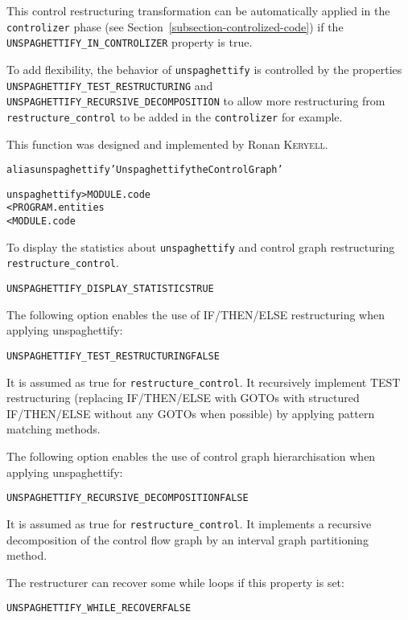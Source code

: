 \documentclass[a4paper]{report}
\newenvironment{PipsProp}{\begin{alltt}}{\end{alltt}}
\newenvironment{PipsMake}{\begin{alltt}}{\end{alltt}}
\begin{document}
This control restructuring transformation can be automatically applied
in the \texttt{controlizer} phase (see
Section~\ref{subsection-controlized-code}) if the
\verb|UNSPAGHETTIFY_IN_CONTROLIZER|
property is true.

To add flexibility, the behavior of \texttt{unspaghettify} is
controlled by the properties
\verb|UNSPAGHETTIFY_TEST_RESTRUCTURING|
and \verb|UNSPAGHETTIFY_RECURSIVE_DECOMPOSITION|
to allow more
restructuring from \verb|restructure_control| to be added in the
\texttt{controlizer} for example.

This function was designed and implemented by Ronan \textsc{Keryell}.
\begin{PipsMake}
alias unspaghettify 'Unspaghettify the Control Graph'
\end{PipsMake}

\begin{PipsMake}
unspaghettify          > MODULE.code
        < PROGRAM.entities
        < MODULE.code
\end{PipsMake}

To display the statistics about \texttt{unspaghettify} and control graph
restructuring \verb/restructure_control/.
\begin{PipsProp}
UNSPAGHETTIFY_DISPLAY_STATISTICS TRUE
\end{PipsProp}

The following option enables the use of IF/THEN/ELSE restructuring
when applying unspaghettify:
\begin{PipsProp}
UNSPAGHETTIFY_TEST_RESTRUCTURING FALSE
\end{PipsProp}
It is assumed as true for \verb/restructure_control/.
It recursively implement TEST restructuring (replacing IF/THEN/ELSE
with GOTOs with structured IF/THEN/ELSE without any GOTOs when
possible) by applying pattern matching methods.

The following option enables the use of control graph hierarchisation
when applying unspaghettify:
\begin{PipsProp}
UNSPAGHETTIFY_RECURSIVE_DECOMPOSITION FALSE
\end{PipsProp}
It is assumed as true for \verb/restructure_control/.
It implements a recursive decomposition of the control flow graph
by an interval graph partitioning method.

The restructurer can recover some while loops if this property is set:
\begin{PipsProp}
UNSPAGHETTIFY_WHILE_RECOVER FALSE
\end{PipsProp}
\end{document}
